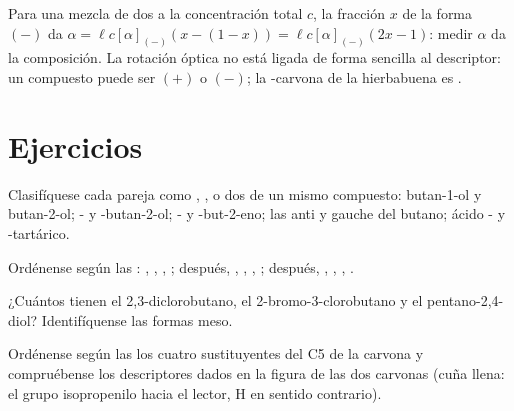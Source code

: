 Para una mezcla de dos  a la concentración total $c$, la
fracción $x$ de la forma $(-)$ da $\alpha = \ell c[\alpha]_{(-)}(x - (1 - x)) =
\ell c[\alpha]_{(-)}(2x - 1)$: medir $\alpha$ da la composición. La
rotación óptica no está ligada de forma sencilla al descriptor: un
compuesto  puede ser $(+)$ o $(-)$; la -carvona de la
hierbabuena es .

\section{Ejercicios}

\begin{exercise}[$\star$]\label{exo:b1:stereochemistry-in-depth:1}
Clasifíquese cada pareja como , ,
 o dos  de un mismo compuesto: butan-1-ol
y butan-2-ol; - y -butan-2-ol; - y -but-2-eno;
las  anti y gauche del butano; ácido - y
-tartárico.
\end{exercise}

\begin{exercise}[$\star$]\label{exo:b1:stereochemistry-in-depth:2}
Ordénense según las : , , , ;
después, , , , ; después,
,
, , .
\end{exercise}

\begin{exercise}[$\star$]\label{exo:b1:stereochemistry-in-depth:3}
¿Cuántos  tienen el 2,3-diclorobutano, el
2-bromo-3-clorobutano y el pentano-2,4-diol? Identifíquense las formas
meso.
\end{exercise}

\begin{exercise}[$\star$]\label{exo:b1:stereochemistry-in-depth:4}
Ordénense según las  los cuatro sustituyentes del C5 de la
carvona y compruébense los descriptores dados en la figura de las dos
carvonas (cuña llena: el grupo isopropenilo hacia el lector, H en sentido
contrario).
\end{exercise}

